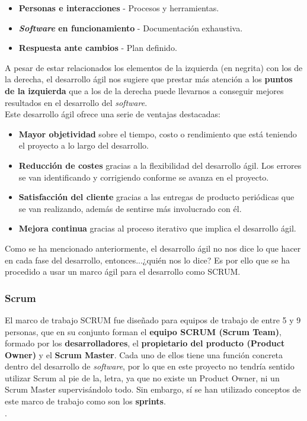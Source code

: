    \begin{itemize}
        \item \textbf{Personas e interacciones} - Procesos y herramientas.
        \item \textbf{\textit{Software} en funcionamiento} - Documentación exhaustiva.
        \item \textbf{Respuesta ante cambios} - Plan definido.
    \end{itemize}

A pesar de estar relacionados los elementos de la izquierda (en negrita) con los de la
derecha, el desarrollo ágil nos sugiere que prestar más atención a los \textbf{puntos
de la izquierda} que a los de la derecha puede llevarnos a conseguir mejores resultados
en el desarrollo del \textit{software}.\\

Este desarrollo ágil ofrece una serie de ventajas \cite{advantages-agile-methodology}
destacadas:

    \begin{itemize}
        \item \textbf{Mayor objetividad} sobre el tiempo, costo o rendimiento que está
        teniendo el proyecto a lo largo del desarrollo.
        \item \textbf{Reducción de costes} gracias a la flexibilidad del desarrollo ágil.
        Los errores se van identificando y corrigiendo conforme se avanza en el proyecto.
        \item \textbf{Satisfacción del cliente} gracias a las entregas de producto
        periódicas que se van realizando, además de sentirse más involucrado con él.
        \item \textbf{Mejora continua} gracias al proceso iterativo que implica el desarrollo
        ágil. 
    \end{itemize}

Como se ha mencionado anteriormente, el desarrollo ágil no nos dice lo que hacer en cada fase
del desarrollo, entonces...¿quién nos lo dice? Es por ello que se ha procedido a usar un
marco ágil para el desarrollo como SCRUM.\\

\subsubsection{Scrum} \label{subsubsec:scrum}
El marco de trabajo SCRUM \cite{scrum} fue diseñado para equipos de trabajo de entre 5 y 9
personas, que en su conjunto forman el \textbf{equipo SCRUM (Scrum Team)}, formado por los
\textbf{desarrolladores}, el \textbf{propietario del producto (Product Owner)} y el
\textbf{Scrum Master}. Cada uno de ellos tiene una función concreta dentro del desarrollo
de \textit{software}, por lo que en este proyecto no tendría sentido utilizar Scrum al pie
de la, letra, ya que no existe un Product Owner, ni un Scrum Master supervisándolo todo. Sin
embargo, sí se han utilizado conceptos de este marco de trabajo como son los \textbf{sprints}.\\.

